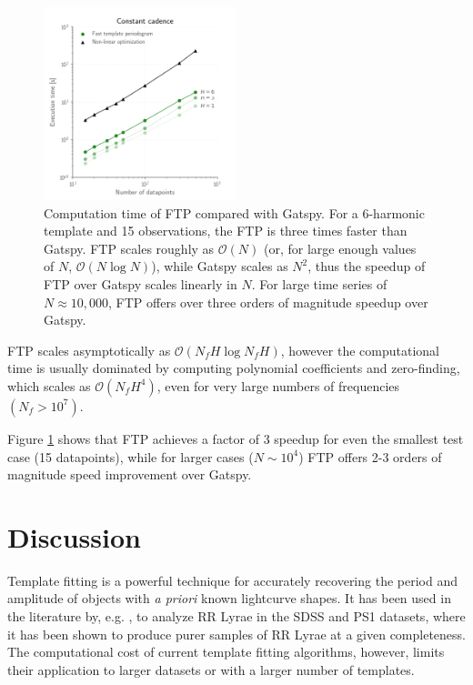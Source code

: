 \documentclass[iop]{emulateapj}
\newcommand{\bigO}{\mathcal{O}}
\begin{document}
\begin{figure}
    \centering
    \includegraphics[width=0.5\textwidth]{plots/timing_vs_ndata.png}
    \caption{\label{fig:timingndata} Computation time of FTP compared with Gatspy. For a 6-harmonic
             template and 15 observations, the FTP is three times faster than 
             Gatspy. FTP scales roughly as $\bigO(N)$ (or, for large enough values
             of $N$, $\bigO(N\log N)$), while Gatspy scales as $N^2$, thus the speedup of FTP
             over Gatspy scales linearly in $N$. For large time series of $N\approx 10,000$,
             FTP offers over three orders of magnitude speedup over Gatspy.}
\end{figure}

FTP scales asymptotically as $\bigO(N_fH\log N_fH)$, however the computational
time is usually dominated by computing polynomial coefficients and zero-finding,
which scales as $\bigO(N_f H^4)$, even for very large numbers of frequencies
$(N_f > 10^7)$. 

Figure \ref{fig:timingndata} shows that FTP achieves a factor of 3 speedup for
even the smallest test case (15 datapoints), while for larger cases ($N\sim10^4$)
FTP offers 2-3 orders of magnitude speed improvement over Gatspy. 

\section{Discussion}\label{sec:discussion}

Template fitting is a powerful technique for accurately recovering
the period and amplitude of objects with \emph{a priori} known
lightcurve shapes. It has been used in the literature by, e.g.
\cite{Sesar_etal_2016, Sesar_etal_2010}, to analyze RR Lyrae in the
SDSS and PS1 datasets, where it has been shown to produce purer
samples of RR Lyrae at a given completeness. The computational
cost of current template fitting algorithms, however, limits their
application to larger datasets or with a larger number of templates.
\end{document}
